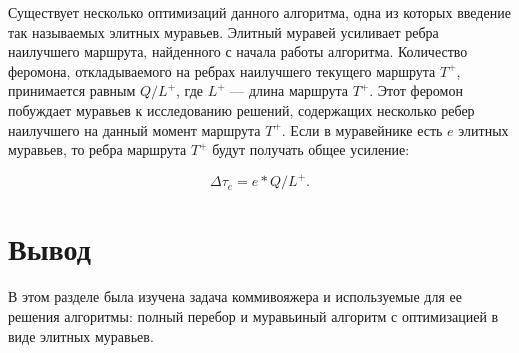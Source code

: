 Существует несколько оптимизаций данного алгоритма, одна из которых введение так называемых элитных муравьев. Элитный муравей усиливает ребра наилучшего маршрута, найденного с начала работы алгоритма. Количество феромона, откладываемого на ребрах наилучшего текущего
маршрута $T^+$, принимается равным $Q/L^+$, где $L^+$ — длина маршрута $T^+$. Этот феромон побуждает муравьев к исследованию решений, содержащих несколько ребер наилучшего на данный момент маршрута $T^+$. Если в муравейнике есть $e$ элитных муравьев, то ребра маршрута $T^+$ будут получать общее усиление:

\begin{equation}
	\label{opt}
	\Delta \tau_{e} = e * Q/L^+.
\end{equation}

\section*{\hsp Вывод}

В этом разделе была изучена задача коммивояжера и используемые для ее решения алгоритмы: полный перебор и муравьиный алгоритм с оптимизацией в виде элитных муравьев.
